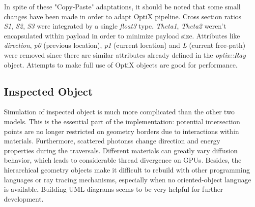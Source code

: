 In spite of these "Copy-Paste" adaptations, it should be noted that some small changes have been made in order to adapt OptiX pipeline. Cross section ratios \textit{S1}, \textit{S2}, \textit{S3} were integrated by a single \textit{float3} type. \textit{Theta1}, \textit{Theta2} weren't encapsulated within payload in order to minimize payload size. Attributes like \textit{direction}, \textit{p0} (previous location), \textit{p1} (current location) and \textit{L} (current free-path) were removed since there are similar attributes already defined in the \textit{optix::Ray} object. Attempts to make full use of OptiX objects are good for performance. 


\subsection{Inspected Object}
Simulation of inspected object is much more complicated than the other two models. This is the essential part of the implementation: potential intersection points are no longer restricted on geometry borders due to interactions within materials. Furthermore, scattered photonss change direction and energy properties during the traversals. Different materials can greatly vary diffusion behavior, which leads to considerable thread divergence on GPUs. Besides, the hierarchical geometry objects make it difficult to rebuild with other programming languages or ray tracing mechanisms, especially when no oriented-object language is available. Building UML diagrams seems to be very helpful for further development.

